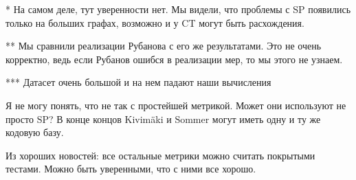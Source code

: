 \documentclass{article}
\begin{document}
{
\small
* На самом деле, тут уверенности нет. Мы видели, что проблемы с SP появились только на больших графах, возможно и у CT могут быть расхождения.

** Мы сравнили реализации Рубанова с его же результатами. Это не очень корректно, ведь если Рубанов ошибся в реализации мер, то мы этого не узнаем.

*** Датасет очень большой и на нем падают наши вычисления
}

\medskip

Я не могу понять, что не так с простейшей метрикой. Может они используют не просто SP? В конце концов Kivim{\"a}ki и Sommer могут иметь одну и ту же кодовую базу.

Из хороших новостей: все остальные метрики можно считать покрытыми тестами. Можно быть уверенными, что с ними все хорошо.
\end{document}
